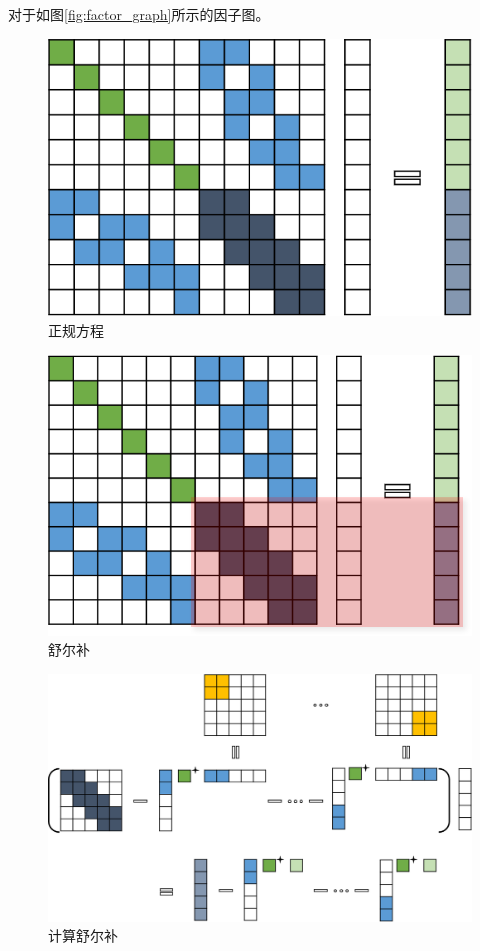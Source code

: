 对于如图\ref{fig:factor_graph}所示的因子图。

\begin{figure}[htb]
    \centering
    \includegraphics{figs/normal_eq.png}
    \caption{正规方程}
\end{figure}

\begin{figure}[htb]
    \centering
    \includegraphics{figs/reduced_sys.png}
    \caption{舒尔补}
\end{figure}

\begin{figure}[htb]
    \centering
    \includegraphics[width=\textwidth]{figs/schur_complement.png}
    \caption{计算舒尔补}
\end{figure}

